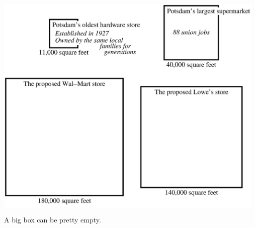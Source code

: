 \begin{center}

\colorbox{white}{
\includegraphics[width=0.975\textwidth]{diagram2.eps}
}

\vspace{0.15in}

{\HeadingSize A big box can be pretty empty.}


\vspace{0.15in}



\colorbox{white}{
\begin{minipage}{0.975\textwidth}
\setlength{\parindent}{0.25in}
\begin{multicols}{3}{

{\TextSize \color{black}

}
	
}
\end{multicols}
\end{minipage}
}

\end{center}